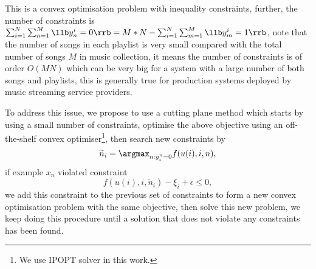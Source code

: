 This is a convex optimisation problem with inequality constraints, 
further, the number of constraints is $\sum_{i=1}^N \sum_{n=1}^M \llb y_n^i = 0 \rrb = M * N - \sum_{i=1}^N \sum_{m=1}^M \llb y_m^i = 1 \rrb$,
note that the number of songs in each playlist is very small compared with the total number of songs $M$ in music collection,
it means the number of constraints is of order $O(MN)$ which can be very big for a system with a large number of both songs and playlists,
this is generally true for production systems deployed by music streaming service providers.

To address this issue, we propose to use a cutting plane method which starts by using a small number of constraints,
optimise the above objective using an off-the-shelf convex optimiser\footnote{We use IPOPT solver in this work.},
then search new constraints by 
\begin{equation*}
\widetilde n_i = \argmax_{n: y_i^n=0} f(u(i), i, n),
\end{equation*}
if example $x_n$ violated constraint
\begin{equation*}
f(u(i), i, \widetilde n_i) - \xi_i + \epsilon \le 0,
\end{equation*}
we add this constraint to the previous set of constraints to form a new convex optimisation problem with the same objective,
then solve this new problem, we keep doing this procedure until a solution that does not violate any constraints has been found.
